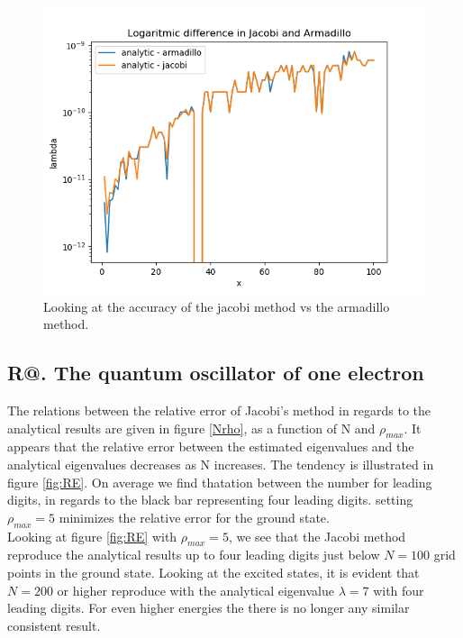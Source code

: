 \documentclass[%
reprint,
amsmath, 
amssymb, 
aps,]{revtex4-1}
\makeatletter
\newcommand*{\rom}[1]{\expandafter\@slowromancap\romannumeral #1@}
\makeatother
\begin{document}
			\begin{figure}
\centering
\includegraphics[scale = 0.6]{results_2b.png}
\caption{Looking at the accuracy of the jacobi method vs the armadillo method.}
\label{fig:my_label}
			\end{figure}

		\subsection*{R\rom{2}. The quantum oscillator of one electron} \noindent 
The relations between the relative error of Jacobi's method in regards to the analytical results are given in figure \ref{Nrho}, as a function of N and $\rho_{max}$. It appears that the relative error between the estimated eigenvalues and the analytical eigenvalues decreases as N increases. The tendency is illustrated in figure \ref{fig:RE}. On average we find thatation between the number for leading digits, in regards to the black bar representing four leading digits. setting $\rho_{max} = 5$ minimizes the relative error for the ground state. \\ \indent 
Looking at figure \ref{fig:RE} with $\rho_{max} = 5$, we see that the Jacobi method reproduce the analytical results up to four leading digits just below $N=100$ grid points in the ground state. Looking at the excited states, it is evident that $N=200$  or higher reproduce with the analytical eigenvalue $\lambda = 7$ with four leading digits. For even higher energies the there is no longer any similar consistent result. \\
\end{document}
